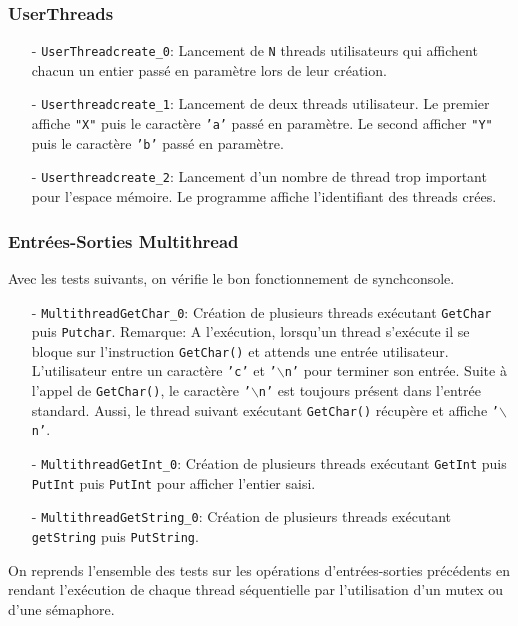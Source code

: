 \documentclass[11pt]{article}
\theoremstyle{definition}
\theoremstyle{definition}
\begin{document}
\subsubsection{UserThreads}
\begin{itemize}
\item[-] \texttt{UserThreadcreate\_0}: Lancement de \texttt{N} threads utilisateurs qui affichent chacun un entier passé en paramètre lors de leur
  création.
\item[-] \texttt{Userthreadcreate\_1}: Lancement de deux threads utilisateur. Le premier affiche \texttt{"X"} puis le caractère \texttt{'a'} passé en paramètre.
  Le second afficher \texttt{"Y"} puis le caractère \texttt{'b'} passé en paramètre.
\item[-] \texttt{Userthreadcreate\_2}: Lancement d'un nombre de thread trop important pour l'espace mémoire.
  Le programme affiche l'identifiant des threads crées.
\end{itemize}

\subsubsection{Entrées-Sorties Multithread}
Avec les tests suivants, on vérifie le bon fonctionnement de synchconsole.
\begin{itemize}
\item[-] \texttt{MultithreadGetChar\_0}: Création de plusieurs threads exécutant \texttt{GetChar}
  puis \texttt{Putchar}.
  Remarque:
  A l'exécution, lorsqu'un thread s'exécute il se bloque sur l'instruction \texttt{GetChar()} et attends une
  entrée utilisateur. L'utilisateur entre un caractère \texttt{'c'} et \texttt{'$\backslash$n'} pour terminer son entrée.
  Suite à l'appel de \texttt{GetChar()}, le caractère \texttt{'$\backslash$n'} est toujours
  présent dans l'entrée standard. Aussi, le thread suivant exécutant \texttt{GetChar()} récupère et
  affiche \texttt{'$\backslash$n'}.
\item[-] \texttt{MultithreadGetInt\_0}: Création de plusieurs threads exécutant \texttt{GetInt} puis  \texttt{PutInt}
  puis \texttt{PutInt} pour afficher l'entier saisi.
\item[-] \texttt{MultithreadGetString\_0}: Création de plusieurs threads exécutant
  \texttt{getString} puis \texttt{PutString}.
\end{itemize}
On reprends l'ensemble des tests sur les opérations d'entrées-sorties précédents en rendant l'exécution de chaque thread séquentielle par l'utilisation d'un mutex ou d'une sémaphore.
\end{document}
